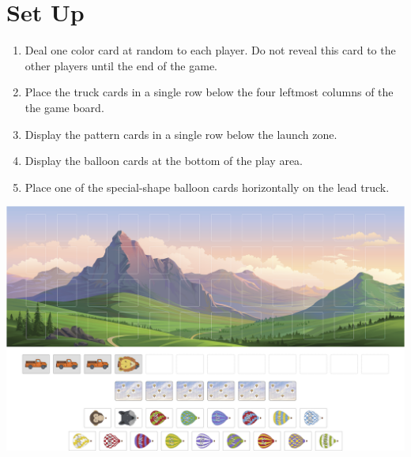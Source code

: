 \documentclass[a6paper, 11pt, parskip=half, DIV=15]{scrartcl}
\begin{document}
\newpage
\enlargethispage{1.75\baselineskip}
\section*{Set Up}
\begin{enumerate}

  \item Deal one color card at random to each player.
  Do not reveal this card to the other players until the end of the game.

 
  \item Place the truck cards in a single row below the four leftmost columns of the the game board.%

   \item Display the pattern cards in a single row below the launch zone.

  \item Display the balloon cards at the bottom of the play area. 

  \item Place one of the special-shape balloon cards horizontally on the lead truck.%
\end{enumerate}
\begin{center}
\includegraphics[scale=0.105]{Images/set_up_diagram.png}
\end{center}
\end{document}
